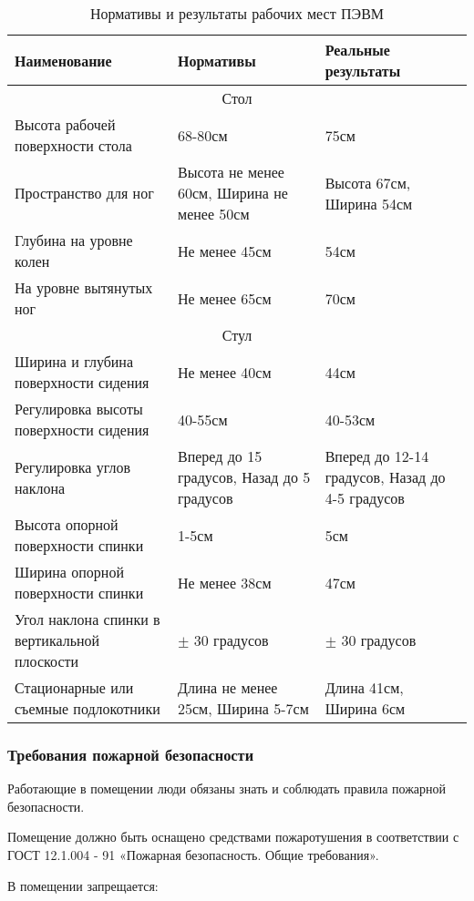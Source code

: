 \begin{center}
 \begin{longtable}[h]{|*3{m{}|}}
  \caption{Нормативы и результаты рабочих мест ПЭВМ} \label{tab:pevm} \\
  \hline
  Наименование & Нормативы & Реальные результаты \\
  \hline
  \multicolumn{3}{|c|}{Стол} \\
  \hline  
  Высота рабочей поверхности стола & 68-80см & 75см \\
  \hline
  Пространство для ног & Высота не менее 60см, Ширина не менее 50см & Высота 67см, Ширина 54см \\
  \hline
  Глубина на уровне колен & Не менее 45см & 54см \\
  \hline
  На уровне вытянутых ног & Не менее 65см & 70см \\
  \hline
  \multicolumn{3}{|c|}{Стул} \\
  \hline
  Ширина и глубина поверхности сидения & Не менее 40см & 44см\\
  \hline
  Регулировка высоты поверхности сидения & 40-55см & 40-53см\\
  \hline
  Регулировка углов наклона & Вперед до 15 градусов, Назад до 5 градусов & Вперед до 12-14 градусов, Назад до 4-5 градусов \\
  \hline
  Высота опорной поверхности спинки & 1-5см & 5см \\
  \hline
  Ширина опорной поверхности спинки & Не менее 38см & 47см \\
  \hline
  Угол наклона спинки в вертикальной плоскости & $\pm$ 30 градусов & $\pm$ 30 градусов \\
  \hline
  Стационарные или съемные подлокотники & Длина не менее 25см, Ширина 5-7см & Длина 41см, Ширина 6см \\
  \hline
 \end{longtable}
\end{center}

\subsubsection{Требования пожарной безопасности}

Работающие в помещении люди обязаны знать и соблюдать правила пожарной безопасности.

Помещение должно быть оснащено средствами пожаротушения в соответствии с ГОСТ 12.1.004 - 91 «Пожарная безопасность. Общие требования»\cite{OT4}.

В помещении запрещается:

